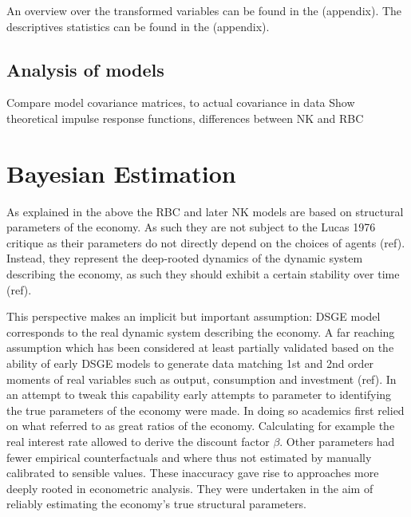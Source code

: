 \documentclass[12pt,a4paper,english]{article} %
\let\oldsection\section
\renewcommand\section{\clearpage\oldsection}
\begin{document}
	An overview over the transformed variables can be found in the (appendix).
	The descriptives statistics can be found in the (appendix).
	
	\subsection{Analysis of models}
	Compare model covariance matrices, to actual covariance in data
	Show theoretical impulse response functions, differences between NK and RBC
			
	\section{Bayesian Estimation}
		
	As explained in the above the RBC and later NK models are based on structural parameters of the economy. As such they are not subject to the Lucas 1976 critique as their parameters do not  directly depend on the choices of agents (ref). Instead, they represent the deep-rooted dynamics of the dynamic system describing the economy, as such they should exhibit a certain stability over time (ref). 
	
	This perspective makes an implicit but important assumption: DSGE model corresponds to the real dynamic system describing the economy. A far reaching assumption which has been considered at least partially validated based on the ability of early DSGE models to generate data matching 1st and 2nd order moments of real variables such as output, consumption and investment (ref). 
	In an attempt to tweak this capability  early attempts to parameter to identifying the true parameters of the economy were made. In doing so academics first relied on what \cite{prescott_theory_1986} referred to as great ratios of the economy. Calculating for example the real interest rate allowed to derive the discount factor $\beta$. 
	Other parameters had fewer empirical counterfactuals and where thus not estimated by manually calibrated to sensible values. These inaccuracy gave rise to approaches more deeply rooted in econometric analysis. They were undertaken in the aim of reliably estimating the economy's true structural parameters.
	
\end{document}
